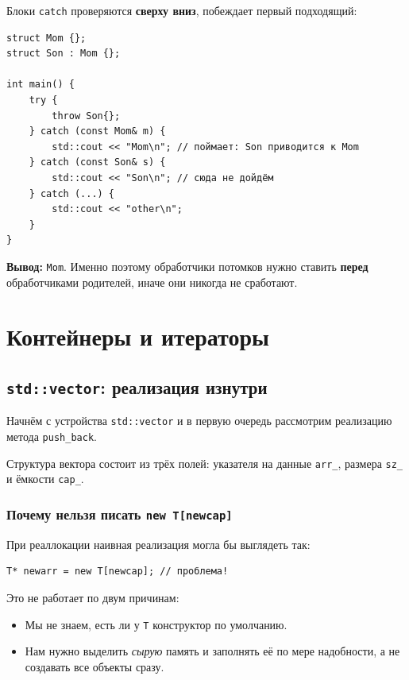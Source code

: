 \documentclass[a4paper,12pt]{article}
\begin{document}
Блоки \texttt{catch} проверяются \textbf{сверху вниз}, побеждает
первый подходящий:

\begin{lstlisting}
struct Mom {};
struct Son : Mom {};

int main() {
    try {
        throw Son{};
    } catch (const Mom& m) {
        std::cout << "Mom\n"; // поймает: Son приводится к Mom
    } catch (const Son& s) {
        std::cout << "Son\n"; // сюда не дойдём
    } catch (...) {
        std::cout << "other\n";
    }
}
\end{lstlisting}

\textbf{Вывод:} \texttt{Mom}. Именно поэтому обработчики потомков
нужно ставить \textbf{перед} обработчиками родителей, иначе они
никогда не сработают.

\newpage
\section{Контейнеры и итераторы}

\subsection{\texttt{std::vector}: реализация изнутри}

Начнём с устройства \texttt{std::vector} и в первую очередь рассмотрим
реализацию метода \texttt{push\_back}.

Структура вектора состоит из трёх полей: указателя на данные \texttt{arr\_},
размера \texttt{sz\_} и ёмкости \texttt{cap\_}.

\subsubsection{Почему нельзя писать \texttt{new T[newcap]}}

При реаллокации наивная реализация могла бы выглядеть так:

\begin{lstlisting}
T* newarr = new T[newcap]; // проблема!
\end{lstlisting}

Это не работает по двум причинам:
\begin{itemize}
    \item Мы не знаем, есть ли у \texttt{T} конструктор по умолчанию.
    \item Нам нужно выделить \textit{сырую} память и заполнять её по мере
          надобности, а не создавать все объекты сразу.
\end{itemize}
\end{document}
